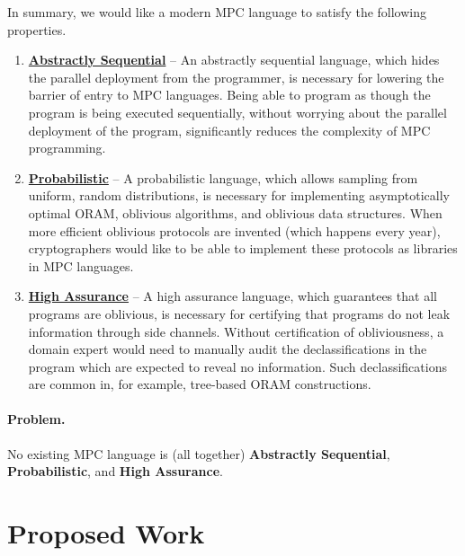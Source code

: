 In summary, we would like a modern MPC language to satisfy the following properties.

\begin{enumerate}
\item \label{itm:sequential} \textbf{\underline{Abstractly Sequential}} -- An abstractly sequential language, which hides the parallel deployment from the
  programmer, is necessary for lowering the barrier of entry to MPC languages. Being able to program as though the program is being executed sequentially,
  without worrying about the parallel deployment of the program, significantly reduces the complexity of MPC programming.
\item \label{itm:probabilistic} \textbf{\underline{Probabilistic}} -- A probabilistic language, which allows sampling from uniform, random distributions,
  is necessary for implementing asymptotically optimal ORAM, oblivious algorithms, and oblivious data structures. When more efficient oblivious protocols are
  invented (which happens every year), cryptographers would like to be able to implement these protocols as libraries in MPC languages.
\item \label{itm:assurance} \textbf{\underline{High Assurance}} -- A high assurance language, which guarantees that all programs are oblivious, is necessary
  for certifying that programs do not leak information through side channels. Without certification of obliviousness, a domain expert
  would need to manually audit the declassifications in the program which are expected to reveal no information. Such declassifications
  are common in, for example, tree-based ORAM constructions.
\end{enumerate}

\paragraph{Problem.} No existing MPC language is (all together) \textbf{Abstractly Sequential}, \textbf{Probabilistic}, and \textbf{High Assurance}.

\section{Proposed Work}
\label{sec:intro-proposal}

 


